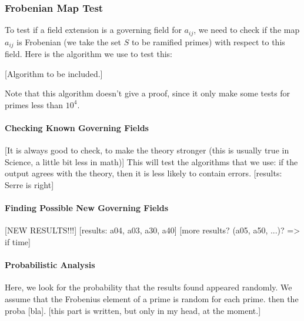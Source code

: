 \subsubsection{Frobenian Map Test}
To test if a field extension is a governing field for $a_{ij}$, we need to check if the map $a_{ij}$ is Frobenian (we take the set $S$ to be ramified primes) with respect to this field.
Here is the algorithm we use to test this:

[Algorithm to be included.]


Note that this algorithm doesn't give a proof, since it only make some tests for primes less than $10^4$.

\paragraph{Checking Known Governing Fields}
[It is always good to check, to make the theory stronger (this is usually true in Science, a little bit less in math)]
This will test the algorithms that we use: if the output agrees with the theory, then it is less likely to contain errors.
[results: Serre is right]

\paragraph{Finding Possible New Governing Fields}
[NEW RESULTS!!!]
[results: a04, a03, a30, a40]
[more results? (a05, a50, ...)? => if time]


\nicefrac{}{}
\paragraph{Probabilistic Analysis}
Here, we look for the probability that the results found appeared randomly.
We assume that the Frobenius element of a prime is random for each prime.
then the proba [bla].
[this part is written, but only in my head, at the moment.]



